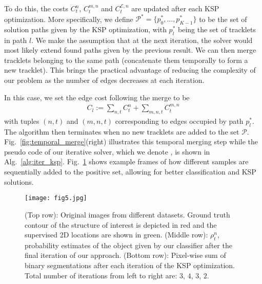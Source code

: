 To do this, the costs $C_t^n$, $C_{t}^{m,n}$ and $C_{t}^{\mathcal{E},n}$ are updated after each KSP optimization. More specifically, we define $\mathcal{P^*} = \{ p_0^*,...,p_{K-1}^*\}$ to be the set of solution paths given by the KSP optimization, with $p_l^*$ being the set of tracklets in path $l$. We make the assumption that at the next iteration, the solver would most likely extend found paths given by the previous result. We can then merge tracklets belonging to the same path (\ie concatenate them temporally to form a new tracklet). This brings the practical advantage of reducing the complexity of our problem as the number of edges decreases at each iteration. 

In this case, we set the edge cost following the merge to be
\begin{equation}
\begin{split}
  C_l := \sum_{n,t}C_t^n + \sum_{m,n,t}C_{t}^{m,n}
\end{split}
\label{eq:cost_transform}
\end{equation}
\noindent
with tuples $(n,t)$ and $(m,n,t)$ corresponding to edges occupied by path $p_l^*$. The algorithm then terminates when no new tracklets are added to the set $\mathcal{P}$. Fig.~\ref{fig:temporal_merge}(right) illustrates this temporal merging step while the pseudo code of our iterative solver, which we denote \KSP, is shown in Alg.~\ref{alg:iter_ksp}. Fig.~\ref{fig:example_iter_ksp} shows example frames of how different samples are sequentially added to the positive set, allowing for better classification and KSP solutions.

\begin{figure}[t]
\centering
\texttt{[image: fig5.jpg]}
\caption{(Top row): Original images from different datasets. Ground truth contour of the structure of interest is depicted in red and the supervised 2D locations are shown in green.
(Middle row): $\rho_{t}^n$, probability estimates of the object given by our classifier after the final iteration of our approach.
(Bottom row): Pixel-wise sum of binary segmentations after each iteration of the KSP optimization. Total number of iterations from left to right are: $3$, $4$, $3$, $2$.}
\label{fig:example_iter_ksp}
\end{figure}


